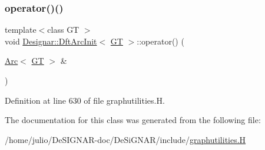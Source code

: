 \subsubsection{\texorpdfstring{operator()()}{operator()()}}
{\footnotesize\ttfamily template$<$class GT $>$ \\
void \hyperlink{class_designar_1_1_dft_arc_init}{Designar\+::\+Dft\+Arc\+Init}$<$ \hyperlink{demo-buildgraph_8_c_a3001c40d2c31ca87ed96cd7d1334a55e}{GT} $>$\+::operator() (\begin{DoxyParamCaption}\item[{\hyperlink{namespace_designar_a3f55fb5513d62ff47cbc8f72b8e95d6f}{Arc}$<$ \hyperlink{demo-buildgraph_8_c_a3001c40d2c31ca87ed96cd7d1334a55e}{GT} $>$ \&}]{ }\end{DoxyParamCaption})\hspace{0.3cm}{\ttfamily [inline]}}



Definition at line 630 of file graphutilities.\+H.



The documentation for this class was generated from the following file\+:\begin{DoxyCompactItemize}
\item 
/home/julio/\+De\+S\+I\+G\+N\+A\+R-\/doc/\+De\+Si\+G\+N\+A\+R/include/\hyperlink{graphutilities_8_h}{graphutilities.\+H}\end{DoxyCompactItemize}
